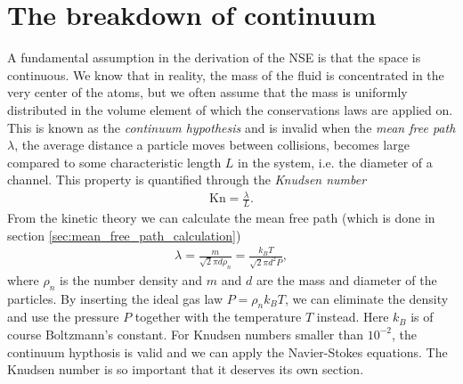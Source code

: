 \section{The breakdown of continuum}
\label{sec:continuum_breakdown}
A fundamental assumption in the derivation of the NSE is that the space is continuous. We know that in reality, the mass of the fluid is concentrated in the very center of the atoms, but we often assume that the mass is uniformly distributed in the volume element of which the conservations laws are applied on. This is known as the \textit{continuum hypothesis} and is invalid when the \textit{mean free path} $\lambda$, the average distance a particle moves between collisions, becomes large compared to some characteristic length $L$ in the system, i.e. the diameter of a channel\cite{karniadakis2005microflows}. This property is quantified through the \textit{Knudsen number}
\begin{align}
	\text{Kn} = \frac{\lambda}{L}.
\end{align}
From the kinetic theory we can calculate the mean free path (which is done in section \ref{sec:mean_free_path_calculation})
\begin{align}
	\lambda = \frac{m}{\sqrt 2 \pi d \rho_n} = \frac{k_B T}{\sqrt 2 \pi d^2 P},
\end{align}
where $\rho_n$ is the number density and $m$ and $d$ are the mass and diameter of the particles. By inserting the ideal gas law $P = \rho_n k_BT$, we can eliminate the density and use the pressure $P$ together with the temperature $T$ instead. Here $k_B$ is of course Boltzmann's constant. For Knudsen numbers smaller than $10^{-2}$, the continuum hypthosis is valid and we can apply the Navier-Stokes equations\cite{karniadakis2005microflows}. The Knudsen number is so important that it deserves its own section.


